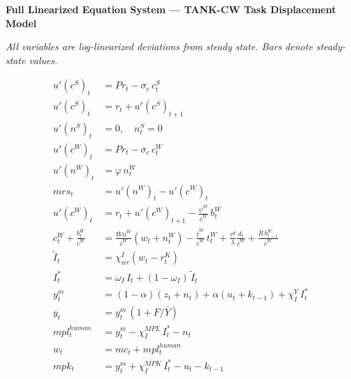 \documentclass[12pt]{article}
\begin{document}
\begin{center}
{\large\textbf{Full Linearized Equation System --- TANK-CW Task Displacement Model}}
\end{center}

\vspace{0.5em}

\noindent\textit{All variables are log-linearized deviations from steady state.
Bars denote steady-state values.}

\vspace{1em}

\begin{align}
u'(c^S)_t &= Pr_t - \sigma_c\, c^S_t
  \tag{1. Capitalist MU} \\[4pt]
u'(c^S)_t &= r_t + u'(c^S)_{t+1}
  \tag{2. Capitalist Euler} \\[4pt]
u'(n^S)_t &= 0, \quad n^S_t = 0
  \tag{3. Capitalists supply no labor} \\[4pt]
u'(c^W)_t &= Pr_t - \sigma_c\, c^W_t
  \tag{4. Worker MU} \\[4pt]
u'(n^W)_t &= \varphi\, n^W_t
  \tag{5. Worker disutility of labor} \\[4pt]
mrs_t &= u'(n^W)_t - u'(c^W)_t
  \tag{6. Worker MRS} \\[4pt]
u'(c^W)_t &= r_t + u'(c^W)_{t+1} - \tfrac{\psi^W}{\bar{c}^W}\, b^W_t
  \tag{7. Worker Euler} \\[4pt]
c^W_t + \tfrac{b^W_t}{\bar{c}^W} &=
  \tfrac{\bar{W}\bar{n}^W}{\bar{c}^W}(w_t + n^W_t)
  - \tfrac{\bar{t}^W}{\bar{c}^W}\,t^W_t
  + \tfrac{\tau^d}{\lambda}\tfrac{d_t}{\bar{c}^W}
  + \tfrac{\bar{R}\, b^W_{t-1}}{\bar{c}^W}
  \tag{8. Worker budget} \\[4pt]
\tilde{I}_t &= \chi^I_{wr}(w_t - r^K_t)
  \tag{9. Cost-min automation threshold} \\[4pt]
I^*_t &= \omega_I\, I_t + (1-\omega_I)\,\tilde{I}_t
  \tag{10. Equilibrium task share} \\[4pt]
y^m_t &= (1-\alpha)(z_t + n_t) + \alpha(u_t + k_{t-1}) + \chi^Y_I\, I^*_t
  \tag{11. Task-based production} \\[4pt]
y_t &= y^m_t\,(1 + F/\bar{Y})
  \tag{12. Retail output} \\[4pt]
mpl^{human}_t &= y^m_t - \chi^{MPL}_I\, I^*_t - n_t
  \tag{13. Human MPL, displacement effect} \\[4pt]
w_t &= mc_t + mpl^{human}_t
  \tag{14. Real wage} \\[4pt]
mpk_t &= y^m_t + \chi^{MPK}_I\, I^*_t - u_t - k_{t-1}
  \tag{15. MPK, capital complementarity} \\[4pt]

\end{align}
\end{document}
